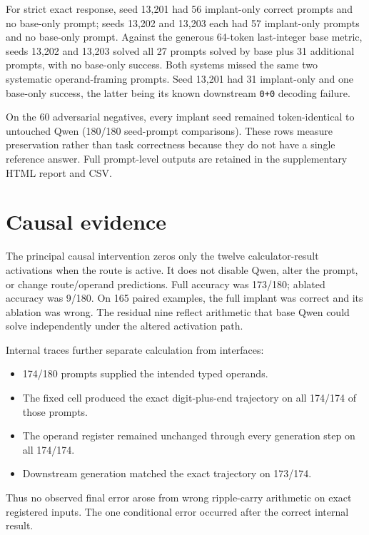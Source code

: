 \documentclass[11pt]{article}
\newcommand{\code}[1]{\texttt{#1}}
\begin{document}
For strict exact response, seed 13,201 had 56 implant-only correct prompts and
no base-only prompt; seeds 13,202 and 13,203 each had 57 implant-only prompts
and no base-only prompt. Against the generous 64-token last-integer base
metric, seeds 13,202 and 13,203 solved all 27 prompts solved by base plus 31
additional prompts, with no base-only success. Both systems missed the same
two systematic operand-framing prompts. Seed 13,201 had 31 implant-only and
one base-only success, the latter being its known downstream \code{0+0}
decoding failure.

On the 60 adversarial negatives, every implant seed remained token-identical
to untouched Qwen (180/180 seed-prompt comparisons). These rows measure
preservation rather than task correctness because they do not have a single
reference answer. Full prompt-level outputs are retained in the supplementary
HTML report and CSV.

\section{Causal evidence}

The principal causal intervention zeros only the twelve calculator-result
activations when the route is active. It does not disable Qwen, alter the
prompt, or change route/operand predictions. Full accuracy was 173/180;
ablated accuracy was 9/180. On 165 paired examples, the full implant was
correct and its ablation was wrong. The residual nine reflect arithmetic that
base Qwen could solve independently under the altered activation path.

Internal traces further separate calculation from interfaces:

\begin{itemize}
\item 174/180 prompts supplied the intended typed operands.
\item The fixed cell produced the exact digit-plus-end trajectory on all
      174/174 of those prompts.
\item The operand register remained unchanged through every generation step
      on all 174/174.
\item Downstream generation matched the exact trajectory on 173/174.
\end{itemize}

Thus no observed final error arose from wrong ripple-carry arithmetic on exact
registered inputs. The one conditional error occurred after the correct
internal result.
\end{document}
